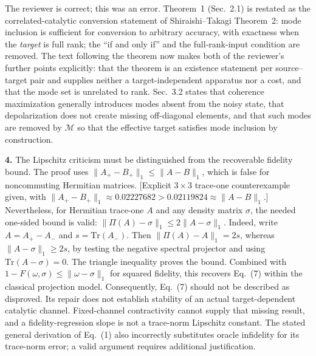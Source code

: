 \documentclass[11pt,a4paper]{article}
\newcommand{\rev}[1]{{\color{black}#1}}
\newcommand{\resp}[1]{{\color{red}#1}}
\begin{document}
\resp{The reviewer is correct; this was an error. Theorem~1 (Sec.~2.1) is restated as the correlated-catalytic conversion statement of Shiraishi--Takagi Theorem~2: mode inclusion is sufficient for conversion to arbitrary accuracy, with exactness when the \emph{target} is full rank; the ``if and only if'' and the full-rank-input condition are removed. The text following the theorem now makes both of the reviewer's further points explicitly: that the theorem is an existence statement per source--target pair and supplies neither a target-independent apparatus nor a cost, and that the mode set is unrelated to rank. Sec.~3.2 states that coherence maximization generally introduces modes absent from the noisy state, that depolarization does not create missing off-diagonal elements, and that such modes are removed by $\mathcal{M}$ so that the effective target satisfies mode inclusion by construction.}

\rev{\textbf{4.} The Lipschitz criticism must be distinguished from the recoverable fidelity bound. The proof uses $\|A_+ - B_+\|_1 \leq \|A - B\|_1$, which is false for noncommuting Hermitian matrices. [Explicit $3\times3$ trace-one counterexample given, with $\|A_+ - B_+\|_1 \approx 0.02227682 > 0.02119824 \approx \|A - B\|_1$.] Nevertheless, for Hermitian trace-one $A$ and any density matrix $\sigma$, the needed one-sided bound is valid: $\|\Pi(A) - \sigma\|_1 \leq 2\|A - \sigma\|_1$. Indeed, write $A = A_+ - A_-$ and $s = \mathrm{Tr}(A_-)$. Then $\|\Pi(A) - A\|_1 = 2s$, whereas $\|A - \sigma\|_1 \geq 2s$, by testing the negative spectral projector and using $\mathrm{Tr}(A - \sigma) = 0$. The triangle inequality proves the bound. Combined with $1 - F(\omega,\sigma) \leq \|\omega - \sigma\|_1$ for squared fidelity, this recovers Eq.~(7) within the classical projection model. Consequently, Eq.~(7) should not be described as disproved. Its repair does not establish stability of an actual target-dependent catalytic channel. Fixed-channel contractivity cannot supply that missing result, and a fidelity-regression slope is not a trace-norm Lipschitz constant. The stated general derivation of Eq.~(1) also incorrectly substitutes oracle infidelity for its trace-norm error; a valid argument requires additional justification.}
\end{document}
